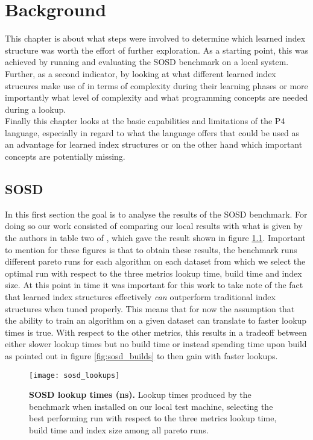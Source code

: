 
\chapter{Background}
\label{ch:background}
This chapter is about what steps were involved to determine which learned index structure was worth the effort of further exploration. As a starting point, this was achieved by running and evaluating the SOSD benchmark \cite{sosd-neurips} on a local system. Further, as a second indicator, by looking at what different learned index strucures make use of in terms of complexity during their learning phases or more importantly what level of complexity and what programming concepts are needed during a lookup.\\

Finally this chapter looks at the basic capabilities and limitations of the P4 language, especially in regard to what the language offers that could be used as an advantage for learned index structures or on the other hand which important concepts are potentially missing.

\section{SOSD}
In this first section the goal is to analyse the results of the SOSD benchmark. For doing so our work consisted of comparing our local results with what is given by the authors in table two of \cite{sosd-neurips}, which gave the result shown in figure \ref{fig:sosd_lookups}. Important to mention for these figures is that to obtain these results, the benchmark runs different pareto runs for each algorithm on each dataset from which we select the optimal run with respect to the three metrics lookup time, build time and index size. At this point in time it was important for this work to take note of the fact that learned index structures effectively \emph{can} outperform traditional index structures when tuned properly. This means that for now the assumption that the ability to train an algorithm on a given dataset can translate to faster lookup times is true. With respect to the other metrics, this results in a tradeoff between either slower lookup times but no build time or instead spending time upon build as pointed out in figure \ref{fig:sosd_builds} to then gain with faster lookups.

\begin{figure}[!ht]
\centering
\texttt{[image: sosd\_lookups]}
\caption[SOSD Lookups]{
  \textbf{SOSD lookup times (ns).}
  Lookup times produced by the benchmark when installed on our local test machine, selecting the best performing run with respect to the three metrics lookup time, build time and index size among all pareto runs.
}
\label{fig:sosd_lookups}
\end{figure}


